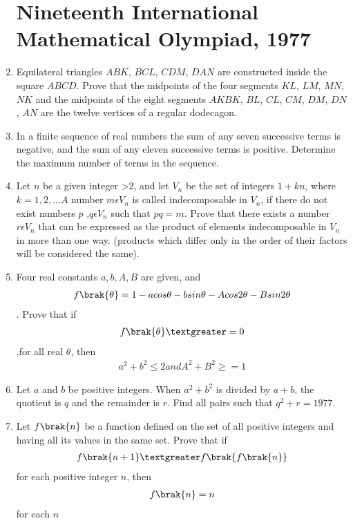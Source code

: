 \documentclass[12pt,-letter paper] {article}
\begin{document}
\begin{enumerate}
\section*{Nineteenth International Mathematical Olympiad, 1977}

\item Equilateral triangles $ABK$, $BCL$, $CDM$, $DAN$ are constructed inside the square $ABCD$. Prove that the midpoints of the four segments $KL$, $LM$, $MN$, $NK$ and the midpoints of the eight segments $AKBK$, $BL$, $CL$, $CM$, $DM$, $DN$, $AN$ are the twelve vertices of a regular dodecagon.

\item In a finite sequence of real numbers the sum of any seven successive terms is negative, and the sum of any eleven successive terms is positive. Determine the maximum number of terms in the sequence.
\item 	Let $n$ be a given integer \textgreater $2$, and let $V_{n}$ be the set of integers $1+ kn$, where $k = 1, 2 ,\ldots A$ number $m \epsilon V_{n}$ is called indecomposable in $V_{n}$, if there do not exist numbers $p$ ,$q \epsilon V_{n}$ such that $pq = m$. Prove that there exists a number $r \epsilon V_{n}$ that can be expressed as the product of elements indecomposable in $V_{n}$ in more than one way. (products which differ only in the order of their factors will be considered the same).
\item Four real constants $a, b, A, B$ are given, and \begin{align}
f\brak{\theta} = 1 - a  cos \theta - b sin \theta - A cos 2\theta - B sin 2\theta
\end{align}. Prove that if 
\begin{align}f\brak{\theta} \textgreater= 0 \end{align} ,for all real $\theta$, then 
\begin{align} a^{2} + b^{2} \leq 2 and A^{2} + B^{2} \geq = 1 \end{align}
\item Let $a$ and $b$ be positive integers. When $a^2 + b^2$ is divided by $a+b$, the quotient is $q$ and the remainder is $r$. Find all pairs  such that $q^2 + r = 1977.$ 
\item	Let $f\brak{n}$ be a function defined on the set of all positive integers and having all its values in the same set. Prove that if \begin{align}f\brak{n + 1} \textgreater f\brak{f\brak{n}}\end{align} for each positive integer $n$, then \begin{align}f\brak{n} = n\end{align} for each $n$
\newpage

\end{enumerate}
\end{document}
